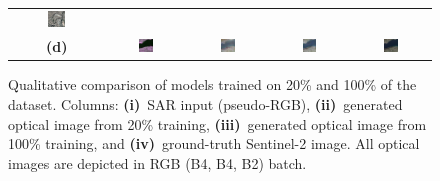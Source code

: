 \begin{figure}[h!]
\begin{tabular}{c *{4}{c}}
        \includegraphics[width=0.2\textwidth, height=0.2\textheight, keepaspectratio]{img/qualitative-20-full/sample_3/gt.png} \\
        \textbf{(d)} &
        \includegraphics[width=0.2\textwidth, height=0.2\textheight, keepaspectratio]{img/qualitative-20-full/sample_4/sar.png} &
        \includegraphics[width=0.2\textwidth, height=0.2\textheight, keepaspectratio]{img/qualitative-20-full/sample_4/gen_0.2.png} &
        \includegraphics[width=0.2\textwidth, height=0.2\textheight, keepaspectratio]{img/qualitative-20-full/sample_4/gen_full.png} &
        \includegraphics[width=0.2\textwidth, height=0.2\textheight, keepaspectratio]{img/qualitative-20-full/sample_4/gt.png} \\
    \end{tabular}

    \caption[Qualitative results for different training data scales: 20\% \& 100\%]{%
    Qualitative comparison of models trained on 20\% and 100\% of the dataset. 
    Columns: \textbf{(i)}~SAR input (pseudo-RGB), 
    \textbf{(ii)}~generated optical image from 20\% training, 
    \textbf{(iii)}~generated optical image from 100\% training, and 
    \textbf{(iv)}~ground-truth Sentinel-2 image. All optical images are depicted in RGB (B4, B4, B2) batch.}
    \label{fig:qualitative_results_100_20}
\end{figure}

